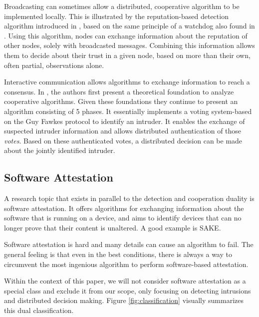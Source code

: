 \documentclass[conference]{IEEEtran}
\begin{document}
\begin{LaTeXdescription}

  \item[Broadcasting] can sometimes allow a distributed, cooperative algorithm
  to be implemented locally. This is illustrated by the reputation-based
  detection algorithm introduced in \cite{ganeriwal2008reputation}, based on
  the same principle of a watchdog also found in \cite{mishra2004intrusion}.
  Using this algorithm, nodes can exchange information about the reputation of
  other nodes, solely with broadcasted messages. Combining this information
  allows them to decide about their trust in a given node, based on more than
  their own, often partial, observations alone.

  \item[Interactive] communication allows algorithms to exchange information to
  reach a consensus. In \cite{krontiris2009cooperative}, the authors first
  present a theoretical foundation to analyze cooperative algorithms. Given
  these foundations they continue to present an algorithm consisting of 5
  phases. It essentially implements a voting system-based on the Guy Fawkes
  protocol\cite{anderson1998new} to identify an intruder. It enables the
  exchange of suspected intruder information and allows distributed
  authentication of those \emph{votes}. Based on these authenticated votes, a
  distributed decision can be made about the jointly identified intruder.

\end{LaTeXdescription}

\subsection*{Software Attestation}
\label{subsection:attestation}

A research topic that exists in parallel to the detection and cooperation
duality is software attestation. It offers algorithms for exchanging
information about the software that is running on a device, and aims to
identify devices that can no longer prove that their content is unaltered. A
good example is SAKE\cite{seshadri2008sake}.

Software attestation is hard and many details can cause an algorithm to fail.
The general feeling is that even in the best conditions, there is always a way
to circumvent the most ingenious algorithm to perform software-based
attestation.

Within the context of this paper, we will not consider software attestation as
a special class and exclude it from our scope, only focusing on detecting
intrusions and distributed decision making. Figure \ref{fig:classification}
visually summarizes this dual classification.
\end{document}
